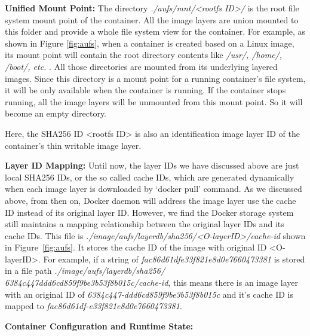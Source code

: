 \textbf{Unified Mount Point:} The directory \textit{./aufs/mnt/<rootfs ID>/ }  is the root file system mount point of the container. All the image layers are union mounted to this folder and provide a whole file system view for the container. For example, as shown in Figure \ref{fig:aufs}, when a container is created based on a Linux image, its mount point will contain the root directory contents like \textit{/usr/, /home/, /boot/, etc. }. All those directories are mounted from its underlying layered images. 
Since this directory is a mount point for a running container's file system, it will be only available when the container is running. If the container stops running, all the image layers will be unmounted from this mount point. So it will become an empty directory.

Here, the SHA256 ID <rootfs ID>  is also an identification image layer ID of the container's thin writable image layer. 

\textbf{Layer ID Mapping:}  
Until now, the layer IDs we have discussed above are just local SHA256 IDs, or the so called cache IDs, which are generated dynamically when each image layer is downloaded by `docker pull' command. As we discussed above, from then on, Docker daemon will address the image layer use the cache ID instead of its original layer ID.
However, we find the Docker storage system still maintains a mapping relationship between the original layer IDs and its cache IDs. This file is \textit{./image/aufs/layerdb/sha256/<O-layerID>/cache-id} shown in Figure~\ref{fig:aufs}.
It stores the cache ID of the image with original ID <O-layerID>. For example, if a string of \textit{
fac86d61dfe33f821e8d0e7660473381} is stored in a file path \textit{./image/aufs/layerdb/sha256/
6384c447ddd6cd859f9be3b53f8b015c/cache-id}, this means there is an image layer with an original ID of \textit{
6384c447-ddd6cd859f9be3b53f8b015c} and it's cache ID is mapped to \textit{
fac86d61df-e33f821e8d0e7660473381}.



\textbf{Container Configuration and Runtime State:}

